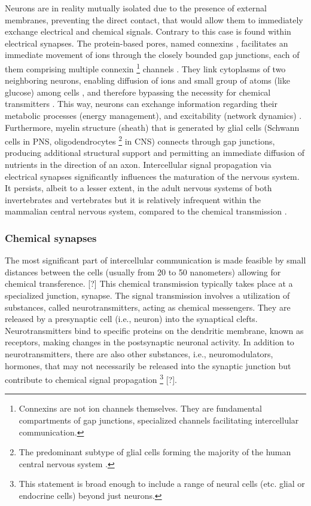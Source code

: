 \documentclass[class={myRUCProject}, crop=false]{standalone}
\begin{document}
Neurons are in reality mutually isolated due to the presence of external membranes, preventing the direct contact, that would allow them to immediately exchange electrical and chemical signals. Contrary to this case is found within electrical synapses. The protein-based pores, named connexins \cite{sohl2005expression}, facilitates an immediate movement of ions through the closely bounded gap junctions, each of them comprising multiple connexin \footnote{Connexins are not ion channels themselves. They are fundamental compartments of gap junctions, specialized channels facilitating intercellular communication.} channels \cite{SZCZUPAK201699}. They link cytoplasms of two neighboring neurons, enabling diffusion of ions and small group of atoms (like glucose) among cells \cite{SZCZUPAK201699}, and therefore bypassing the necessity for chemical transmitters \cite{kandel2000principles}. This way, neurons can exchange information regarding their metabolic processes (energy management), and excitability (network dynamics) \cite{SZCZUPAK201699}. Furthermore, myelin structure (sheath) that is generated by glial cells (Schwann cells in PNS, oligodendrocytes \footnote{The predominant subtype of glial cells forming the majority of the human central nervous system \cite{wei2019histology}.} in CNS) connects through gap junctions, producing additional structural support and permitting an immediate diffusion of nutrients in the direction of an axon\cite{SHOYKHET2011783}. Intercellular signal propagation via electrical synapses significantly influences the maturation of the nervous system. It persists, albeit to a lesser extent, in the adult nervous systems of both invertebrates and vertebrates \cite{SZCZUPAK201699} but it is relatively infrequent within the mammalian central nervous system, compared to the chemical transmission \cite{lovinger2008communication, sohl2005expression}. 


\subsubsection{Chemical synapses}

The most significant part of intercellular communication is made feasible by small distances between the cells (usually from 20 to 50 nanometers) allowing for chemical transference. [?] This chemical transmission typically takes place at a specialized junction, synapse. The signal transmission involves a utilization of substances, called neurotransmitters, acting as chemical messengers. They are released by a presynaptic cell (i.e., neuron) into the synaptical clefts. Neurotransmitters bind to specific proteins on the dendritic membrane, known as receptors, making changes in the postsynaptic neuronal activity. In addition to neurotransmitters, there are also other substances, i.e., neuromodulators, hormones, that may not necessarily be released into the synaptic junction but contribute to chemical signal propagation \footnote{This statement is broad enough to include a range of neural cells (etc. glial or endocrine cells) beyond just neurons.} [?].
\end{document}
